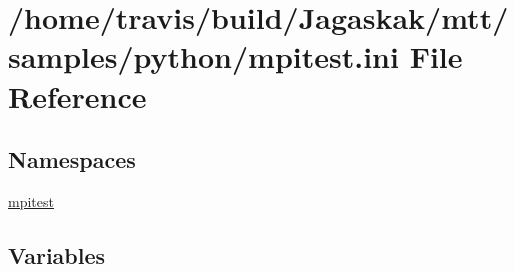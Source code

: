 \hypertarget{mpitest_8ini}{\section{/home/travis/build/\-Jagaskak/mtt/samples/python/mpitest.ini File Reference}
\label{mpitest_8ini}
}
\subsection*{Namespaces}
\begin{DoxyCompactItemize}
\item 
\hyperlink{namespacempitest}{mpitest}
\end{DoxyCompactItemize}
\subsection*{Variables}
